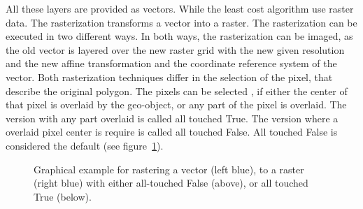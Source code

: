 All these layers are provided as vectors.
While the least cost algorithm use raster data.
The rasterization transforms a vector into a raster.
The rasterization can be executed in two different ways.
In both ways, the rasterization can be imaged, as the old vector is layered over the new raster grid with the new
given resolution and the new affine transformation and the coordinate reference system of the vector.
Both rasterization techniques differ in the selection of the pixel, that describe the original polygon.
The pixels can be selected , if either the center of that pixel is overlaid
by the geo-object, or any part of the pixel is overlaid.
The version with any part overlaid is called all touched True.
The version where a overlaid pixel center is require is called all touched False.
All touched False is considered the default (see figure~\ref{fig:alltouched}).
\begin{figure}[!ht]
	\centering

	\vspace*{5mm}
	\caption{Graphical example for rastering a vector (left blue), to a raster (right blue) with either all-touched False (above), or all touched True (below).}
	\label{fig:alltouched}

\end{figure}

